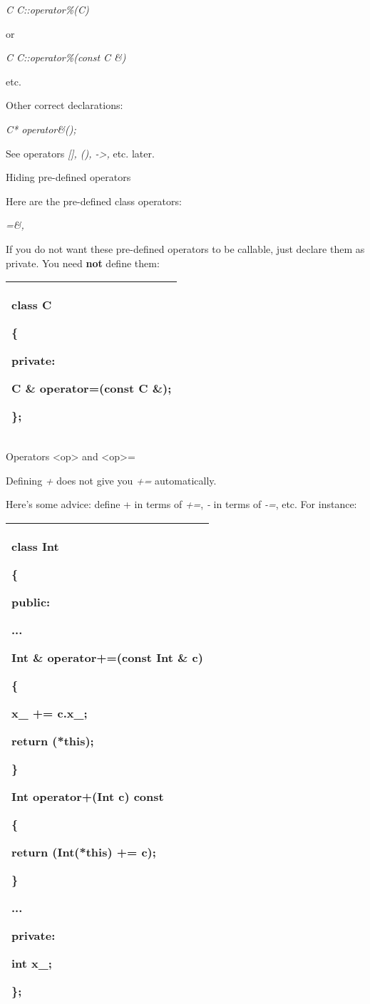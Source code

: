\documentclass[
]{article}
\begin{document}
\emph{C C::operator\%(C) }

or

\emph{C C::operator\%(const C \&)}

etc.

Other correct declarations:

\emph{C* operator\&();}

See operators \emph{{[}{]}, (), -\textgreater,} etc. later.

Hiding pre-defined operators

Here are the pre-defined class operators:

\emph{=\&,}

If you do not want these pre-defined operators to be callable, just
declare them as private. You need \textbf{not} define them:

\begin{longtable}[]{@{}l@{}}
\toprule
\endhead
\begin{minipage}[t]{0.97\columnwidth}\raggedright
class C

\{

private:

C \& operator=(const C \&);

\};\strut
\end{minipage}\tabularnewline
\bottomrule
\end{longtable}

Operators \textless op\textgreater{} and \textless op\textgreater=

Defining \emph{+} does not give you \emph{+=} automatically.

Here's some advice: define + in terms of \emph{+=}, \emph{-} in terms of
\emph{-=}, etc. For instance:

\begin{longtable}[]{@{}l@{}}
\toprule
\endhead
\begin{minipage}[t]{0.97\columnwidth}\raggedright
class Int

\{

public:

...

Int \& operator+=(const Int \& c)

\{

x\_ += c.x\_;

return (*this);

\}

Int operator+(Int c) const

\{

return (Int(*this) += c);

\}

...

private:

int x\_;

\};\strut
\end{minipage}\tabularnewline
\bottomrule
\end{longtable}
\end{document}
